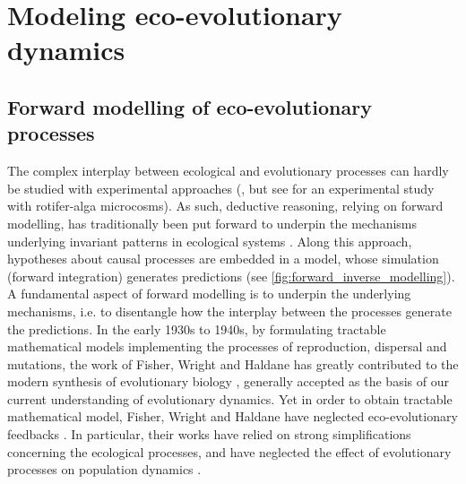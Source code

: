 \section{Modeling eco-evolutionary dynamics}

\subsection{Forward modelling of eco-evolutionary processes}
The complex interplay between ecological and evolutionary processes can hardly be studied with experimental approaches (\cite{Pontarp2019,Hagen2022}, but see \cite{Becks2012} for an experimental study with rotifer-alga microcosms). 
As such, deductive reasoning, relying on forward modelling, has traditionally been put forward to underpin the mechanisms underlying invariant patterns in ecological systems \citep{Brummitt2020}. Along this approach, hypotheses about causal processes are embedded in a model, whose simulation (forward integration) generates predictions (see \cref{fig:forward_inverse_modelling}). A fundamental aspect of forward modelling is to underpin the underlying mechanisms, i.e. to disentangle how the interplay between the processes generate the predictions. 
% 
In the early 1930s to 1940s, by formulating tractable mathematical models implementing the processes of reproduction, dispersal and mutations, the work of Fisher, Wright and Haldane has greatly contributed to the modern synthesis of evolutionary biology \citep{huxley1942evolution}, generally accepted as the basis of our current understanding of evolutionary dynamics. 
% 
Yet in order to obtain tractable mathematical model, Fisher, Wright and Haldane have neglected eco-evolutionary feedbacks \citep{Govaert2019}. In particular, their works have relied on strong simplifications concerning the ecological processes, and have neglected the effect of evolutionary processes on population dynamics \citep{Lion2022}.

